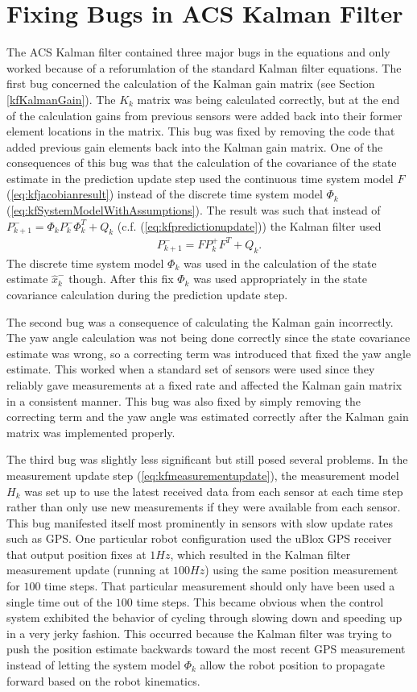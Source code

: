 \section{Fixing Bugs in ACS Kalman Filter}
\label{sec:kfBugs}
The ACS Kalman filter contained three major bugs in the equations and only worked because of a reforumlation of the standard Kalman filter equations. The first bug concerned the calculation of the Kalman gain matrix (see Section \ref{kfKalmanGain}). The $K_k$ matrix was being calculated correctly, but at the end of the calculation gains from previous sensors were added back into their former element locations in the matrix. This bug was fixed by removing the code that added previous gain elements back into the Kalman gain matrix. One of the consequences of this bug was that the calculation of the covariance of the state estimate in the prediction update step used the continuous time system model $F$ (\ref{eq:kfjacobianresult}) instead of the discrete time system model $\Phi_k$ (\ref{eq:kfSystemModelWithAssumptions}). The result was such that instead of $P_{k+1}^- = \Phi_kP_k^-\Phi_k^T + Q_k$ (c.f. (\ref{eq:kfpredictionupdate})) the Kalman filter used
\begin{align*}
P_{k+1}^- = FP_k^+F^T + Q_k.
\end{align*}
The discrete time system model $\Phi_k$ was used in the calculation of the state estimate $\hat{x}_k^-$ though. After this fix $\Phi_k$ was used appropriately in the state covariance calculation during the prediction update step.

The second bug was a consequence of calculating the Kalman gain incorrectly. The yaw angle calculation was not being done correctly since the state covariance estimate was wrong, so a correcting term was introduced that fixed the yaw angle estimate. This worked when a standard set of sensors were used since they reliably gave measurements at a fixed rate and affected the Kalman gain matrix in a consistent manner. This bug was also fixed by simply removing the correcting term and the yaw angle was estimated correctly after the Kalman gain matrix was implemented properly.

The third bug was slightly less significant but still posed several problems. In the measurement update step (\ref{eq:kfmeasurementupdate}), the measurement model $H_k$ was set up to use the latest received data from each sensor at each time step rather than only use new measurements if they were available from each sensor. This bug manifested itself most prominently in sensors with slow update rates such as GPS. One particular robot configuration used the uBlox GPS receiver that output position fixes at $1 Hz$, which resulted in the Kalman filter measurement update (running at $100 Hz$) using the same position measurement for $100$ time steps. That particular measurement should only have been used a single time out of the $100$ time steps. This became obvious when the control system exhibited the behavior of cycling through slowing down and speeding up in a very jerky fashion. This occurred because the Kalman filter was trying to push the position estimate backwards toward the most recent GPS measurement instead of letting the system model $\Phi_k$ allow the robot position to propagate forward based on the robot kinematics.


